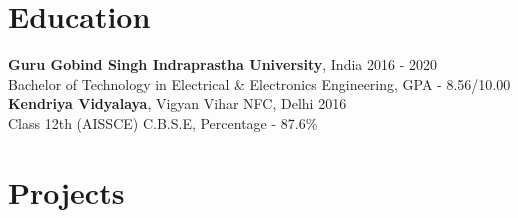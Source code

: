 \documentclass[10pt]{report}
\begin{document}
\section*{\color{BlueViolet}\faBook\hspace{1pt} Education} %
\textbf{Guru Gobind Singh Indraprastha University}, India
\hfill 2016 - 2020\\
Bachelor of Technology in Electrical \& Electronics Engineering, GPA - 8.56/10.00
\vspace{10pt}
\\
\textbf{Kendriya Vidyalaya}, Vigyan Vihar NFC, Delhi
\hfill 2016\\
Class 12th (AISSCE) C.B.S.E, Percentage - 87.6\%

\section*{\color{BlueViolet}\faLaptop\hspace{1pt} Projects}%
\end{document}
